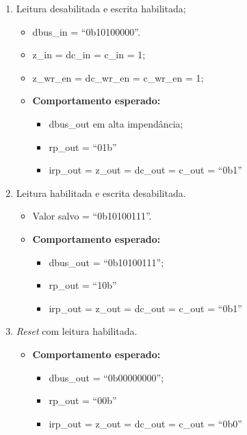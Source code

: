 \documentclass{article}
\begin{document}
\begin{enumerate}
    \item Leitura desabilitada e escrita habilitada;
    \begin{itemize}
        \item dbus\_in = ``0b10100000''.
        \item z\_in = dc\_in = c\_in = 1;
        \item z\_wr\_en = dc\_wr\_en = c\_wr\_en = 1;
        \item \textbf{Comportamento esperado:}
        \begin{itemize}
            \item dbus\_out em alta impendância;
            \item rp\_out = ``01b''
            \item irp\_out = z\_out = dc\_out = c\_out = ``0b1''
        \end{itemize}
    \end{itemize}

    \item Leitura habilitada e escrita desabilitada.
    \begin{itemize}
        \item Valor salvo = ``0b10100111''.
        \item \textbf{Comportamento esperado:}
        \begin{itemize}
            \item dbus\_out = ``0b10100111'';
            \item rp\_out = ``10b''
            \item irp\_out = z\_out = dc\_out = c\_out = ``0b1''
        \end{itemize}
    \end{itemize}

    \item \textit{Reset} com leitura habilitada.
    \begin{itemize}
        \item \textbf{Comportamento esperado:}
        \begin{itemize}
            \item dbus\_out = ``0b00000000'';
            \item rp\_out = ``00b''
            \item irp\_out = z\_out = dc\_out = c\_out = ``0b0''
        \end{itemize}
    \end{itemize}
\end{enumerate}
\end{document}
